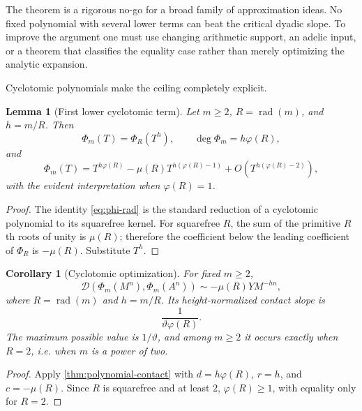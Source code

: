 \documentclass[11pt]{article}
\newtheorem{corollary}[theorem]{Corollary}
\newtheorem{lemma}[theorem]{Lemma}
\theoremstyle{definition}
\newcommand{\rad}{\operatorname{rad}}
\newcommand{\vphi}{\varphi}
\newcommand{\vtheta}{\vartheta}
\newcommand{\Dlog}{\mathscr D}
\begin{document}
\begin{aenovelbox}
The theorem is a rigorous no-go for a broad family of approximation ideas.  No fixed
polynomial with several lower terms can beat the critical dyadic slope.  To improve the
argument one must use changing arithmetic support, an adelic input, or a theorem that
classifies the equality case rather than merely optimizing the analytic expansion.
\end{aenovelbox}

Cyclotomic polynomials make the ceiling completely explicit.

\begin{lemma}[First lower cyclotomic term]\label{lem:cyclotomic-first}
Let $m\ge2$, $R=\rad(m)$, and $h=m/R$.  Then
\begin{equation}\label{eq:phi-rad}
 \Phi_m(T)=\Phi_R(T^h),
 \qquad
 \deg\Phi_m=h\vphi(R),
\end{equation}
and
\begin{equation}\label{eq:phi-first}
 \Phi_m(T)
 =T^{h\vphi(R)}-\mu(R)T^{h(\vphi(R)-1)}
 +O\!\left(T^{h(\vphi(R)-2)}\right),
\end{equation}
with the evident interpretation when $\vphi(R)=1$.
\end{lemma}

\begin{proof}
The identity \eqref{eq:phi-rad} is the standard reduction of a cyclotomic polynomial to
its squarefree kernel.  For squarefree $R$, the sum of the primitive $R$th roots of unity
is $\mu(R)$; therefore the coefficient below the leading coefficient of $\Phi_R$ is
$-\mu(R)$.  Substitute $T^h$.
\end{proof}

\begin{corollary}[Cyclotomic optimization]\label{cor:cyclotomic-optimal}
For fixed $m\ge2$,
\begin{equation}\label{eq:phi-defect-asymp}
 \Dlog(\Phi_m(M^n),\Phi_m(A^n))
 \sim-\mu(R)Y M^{-hn},
\end{equation}
where $R=\rad(m)$ and $h=m/R$.  Its height-normalized contact slope is
\begin{equation}\label{eq:phi-slope}
 \frac{1}{\vtheta\vphi(R)}.
\end{equation}
The maximum possible value is $1/\vtheta$, and among $m\ge2$ it occurs exactly when
$R=2$, i.e. when $m$ is a power of two.
\end{corollary}

\begin{proof}
Apply \cref{thm:polynomial-contact} with
$d=h\vphi(R)$, $r=h$, and $c=-\mu(R)$.  Since $R$ is squarefree and at least $2$,
$\vphi(R)\ge1$, with equality only for $R=2$.
\end{proof}
\end{document}
